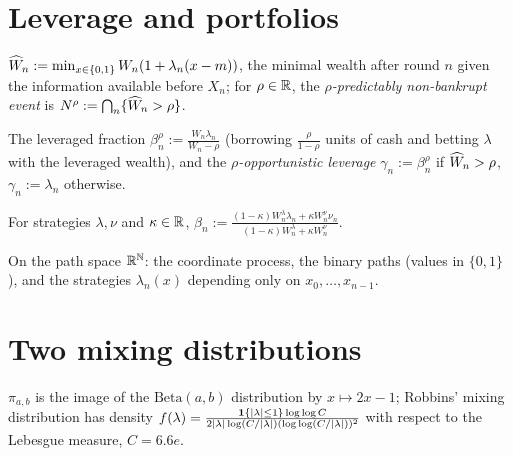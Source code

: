 \section{Leverage and portfolios}

\begin{definition}
  \label{def:pnb}
  \leanok
  $\widehat{W}_n := \min_{x \in \{0, 1\}} W_n (1 + \lambda_n (x - m))$, the minimal wealth after round $n$
  given the information available before $X_n$; for $\rho \in \mathbb{R}$, the \emph{$\rho$-predictably
  non-bankrupt event} is $N^\rho := \bigcap_n \{\widehat{W}_n > \rho\}$.
\end{definition}

\begin{definition}[Leverage]
  \label{def:leverage}
  \leanok
  The leveraged fraction $\beta^\rho_n := \frac{W_n \lambda_n}{W_n - \rho}$ (borrowing
  $\frac{\rho}{1-\rho}$ units of cash and betting $\lambda$ with the leveraged wealth), and the
  \emph{$\rho$-opportunistic leverage} $\gamma_n := \beta^\rho_n$ if $\widehat{W}_n > \rho$, $\gamma_n :=
  \lambda_n$ otherwise.
\end{definition}

\begin{definition}
  \label{def:portfolio}
  \leanok
  For strategies $\lambda, \nu$ and $\kappa \in \mathbb{R}$,
  $\beta_n := \frac{(1-\kappa) W^\lambda_n \lambda_n + \kappa W^\nu_n \nu_n}{(1-\kappa)W^\lambda_n +
  \kappa W^\nu_n}$.
\end{definition}

\begin{definition}[Paths]
  \label{def:paths}
  \leanok
  On the path space $\mathbb{R}^{\mathbb{N}}$: the coordinate process, the binary paths (values in $\{0,1\}$),
  and the strategies $\lambda_n(x)$ depending only on $x_0, \dots, x_{n-1}$.
\end{definition}

\section{Two mixing distributions}

\begin{definition}
  \label{def:mixtures}
  \leanok
  $\pi_{a,b}$ is the image of the $\mathrm{Beta}(a, b)$ distribution by $x \mapsto 2x - 1$;
  Robbins' mixing distribution has density
  $f(\lambda) = \frac{\mathbf{1}\{\lvert \lambda \rvert \le 1\} \log\log C}{2 \lvert \lambda \rvert \log(C/\lvert \lambda \rvert)
  (\log\log(C/\lvert \lambda \rvert))^2}$ with respect to the Lebesgue measure, $C = 6.6 e$.
\end{definition}

